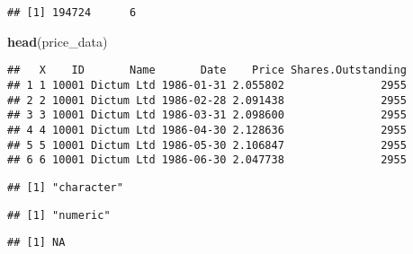 \documentclass[
]{article}
\newenvironment{Shaded}{\begin{snugshade}}{\end{snugshade}}
\newcommand{\FunctionTok}[1]{\textcolor[rgb]{0.13,0.29,0.53}{\textbf{#1}}}
\newcommand{\NormalTok}[1]{#1}
\newcommand{\SpecialCharTok}[1]{\textcolor[rgb]{0.81,0.36,0.00}{\textbf{#1}}}
\begin{document}
\begin{verbatim}
## [1] 194724      6
\end{verbatim}

\begin{Shaded}
\begin{Highlighting}[]
\FunctionTok{head}\NormalTok{(price\_data)}
\end{Highlighting}
\end{Shaded}

\begin{verbatim}
##   X    ID       Name       Date    Price Shares.Outstanding
## 1 1 10001 Dictum Ltd 1986-01-31 2.055802               2955
## 2 2 10001 Dictum Ltd 1986-02-28 2.091438               2955
## 3 3 10001 Dictum Ltd 1986-03-31 2.098600               2955
## 4 4 10001 Dictum Ltd 1986-04-30 2.128636               2955
## 5 5 10001 Dictum Ltd 1986-05-30 2.106847               2955
## 6 6 10001 Dictum Ltd 1986-06-30 2.047738               2955
\end{verbatim}

\begin{Shaded}
\end{Shaded}

\begin{verbatim}
## [1] "character"
\end{verbatim}

\begin{Shaded}
\end{Shaded}

\begin{verbatim}
## [1] "numeric"
\end{verbatim}

\begin{Shaded}
\end{Shaded}

\begin{verbatim}
## [1] NA
\end{verbatim}
\end{document}
